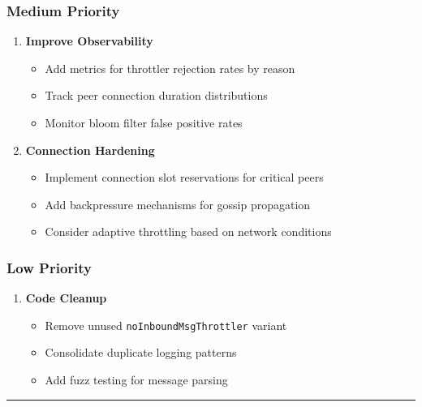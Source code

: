 \documentclass[
]{article}
\providecommand{\tightlist}{%
  \setlength{\itemsep}{0pt}\setlength{\parskip}{0pt}}
\begin{document}
\subsubsection{Medium Priority}\label{medium-priority}

\begin{enumerate}
\def\labelenumi{\arabic{enumi}.}
\setcounter{enumi}{4}
\item
  \textbf{Improve Observability}

  \begin{itemize}
  \tightlist
  \item
    Add metrics for throttler rejection rates by reason
  \item
    Track peer connection duration distributions
  \item
    Monitor bloom filter false positive rates
  \end{itemize}
\item
  \textbf{Connection Hardening}

  \begin{itemize}
  \tightlist
  \item
    Implement connection slot reservations for critical peers
  \item
    Add backpressure mechanisms for gossip propagation
  \item
    Consider adaptive throttling based on network conditions
  \end{itemize}
\end{enumerate}

\subsubsection{Low Priority}\label{low-priority}

\begin{enumerate}
\def\labelenumi{\arabic{enumi}.}
\setcounter{enumi}{6}
\tightlist
\item
  \textbf{Code Cleanup}

  \begin{itemize}
  \tightlist
  \item
    Remove unused \texttt{noInboundMsgThrottler} variant
  \item
    Consolidate duplicate logging patterns
  \item
    Add fuzz testing for message parsing
  \end{itemize}
\end{enumerate}

\begin{center}\rule{0.5\linewidth}{0.5pt}\end{center}
\end{document}

